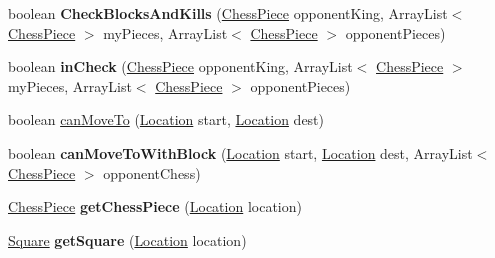\begin{DoxyCompactItemize}
\item 
boolean {\bfseries Check\+Blocks\+And\+Kills} (\hyperlink{class_chess_pieces_1_1_chess_piece}{Chess\+Piece} opponent\+King, Array\+List$<$ \hyperlink{class_chess_pieces_1_1_chess_piece}{Chess\+Piece} $>$ my\+Pieces, Array\+List$<$ \hyperlink{class_chess_pieces_1_1_chess_piece}{Chess\+Piece} $>$ opponent\+Pieces)\hypertarget{class_board_and_game_1_1_board_a6e45ab270b5ee8cecd191a3cf380b1e5}{}\label{class_board_and_game_1_1_board_a6e45ab270b5ee8cecd191a3cf380b1e5}

\item 
boolean {\bfseries in\+Check} (\hyperlink{class_chess_pieces_1_1_chess_piece}{Chess\+Piece} opponent\+King, Array\+List$<$ \hyperlink{class_chess_pieces_1_1_chess_piece}{Chess\+Piece} $>$ my\+Pieces, Array\+List$<$ \hyperlink{class_chess_pieces_1_1_chess_piece}{Chess\+Piece} $>$ opponent\+Pieces)\hypertarget{class_board_and_game_1_1_board_a8446160245d5c189c3875a9511f727ec}{}\label{class_board_and_game_1_1_board_a8446160245d5c189c3875a9511f727ec}

\item 
boolean \hyperlink{class_board_and_game_1_1_board_aca2ba816fbc7e6281ae9fa5f07f99fe9}{can\+Move\+To} (\hyperlink{class_chess_pieces_1_1_location}{Location} start, \hyperlink{class_chess_pieces_1_1_location}{Location} dest)
\item 
boolean {\bfseries can\+Move\+To\+With\+Block} (\hyperlink{class_chess_pieces_1_1_location}{Location} start, \hyperlink{class_chess_pieces_1_1_location}{Location} dest, Array\+List$<$ \hyperlink{class_chess_pieces_1_1_chess_piece}{Chess\+Piece} $>$ opponent\+Chess)\hypertarget{class_board_and_game_1_1_board_af69f26e31d18896274d8ef21a39488b8}{}\label{class_board_and_game_1_1_board_af69f26e31d18896274d8ef21a39488b8}

\item 
\hyperlink{class_chess_pieces_1_1_chess_piece}{Chess\+Piece} {\bfseries get\+Chess\+Piece} (\hyperlink{class_chess_pieces_1_1_location}{Location} location)\hypertarget{class_board_and_game_1_1_board_a9923a7cad02defefd058588120bd45e6}{}\label{class_board_and_game_1_1_board_a9923a7cad02defefd058588120bd45e6}

\item 
\hyperlink{class_board_and_game_1_1_square}{Square} {\bfseries get\+Square} (\hyperlink{class_chess_pieces_1_1_location}{Location} location)\hypertarget{class_board_and_game_1_1_board_a71e3336b3e67e2aa0833cbb1863651bd}{}\label{class_board_and_game_1_1_board_a71e3336b3e67e2aa0833cbb1863651bd}


\end{DoxyCompactItemize}
